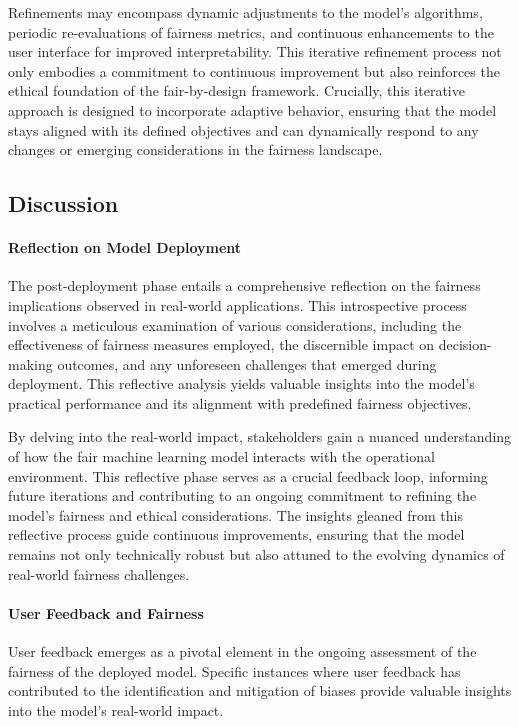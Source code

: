 Refinements may encompass dynamic adjustments to the model's algorithms, periodic re-evaluations of fairness metrics, and continuous enhancements to the user interface for improved interpretability. This iterative refinement process not only embodies a commitment to continuous improvement but also reinforces the ethical foundation of the fair-by-design framework. Crucially, this iterative approach is designed to incorporate adaptive behavior, ensuring that the model stays aligned with its defined objectives and can dynamically respond to any changes or emerging considerations in the fairness landscape.

\subsection{Discussion}

\paragraph{Reflection on Model Deployment}

The post-deployment phase entails a comprehensive reflection on the fairness implications observed in real-world applications. This introspective process involves a meticulous examination of various considerations, including the effectiveness of fairness measures employed, the discernible impact on decision-making outcomes, and any unforeseen challenges that emerged during deployment. This reflective analysis yields valuable insights into the model's practical performance and its alignment with predefined fairness objectives.

By delving into the real-world impact, stakeholders gain a nuanced understanding of how the fair machine learning model interacts with the operational environment. This reflective phase serves as a crucial feedback loop, informing future iterations and contributing to an ongoing commitment to refining the model's fairness and ethical considerations. The insights gleaned from this reflective process guide continuous improvements, ensuring that the model remains not only technically robust but also attuned to the evolving dynamics of real-world fairness challenges.

\paragraph{User Feedback and Fairness}

User feedback emerges as a pivotal element in the ongoing assessment of the fairness of the deployed model. Specific instances where user feedback has contributed to the identification and mitigation of biases provide valuable insights into the model's real-world impact.

